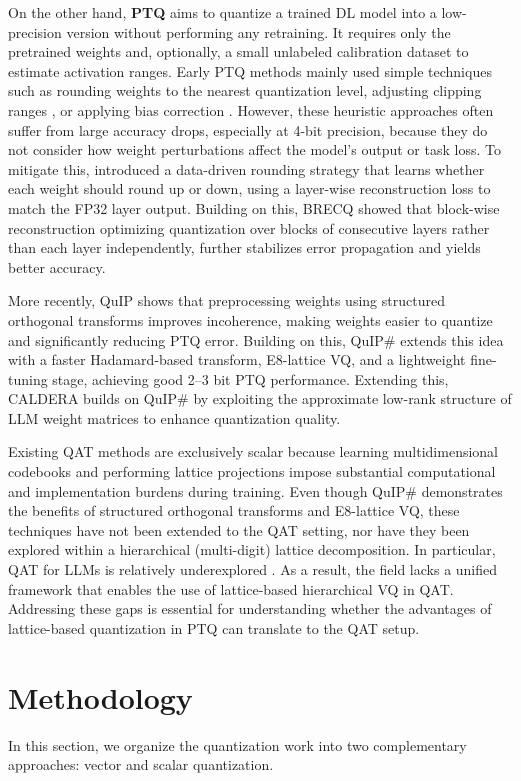 \documentclass{article}
\theoremstyle{definition}
\theoremstyle{remark}
\begin{document}
On the other hand, \textbf{PTQ} aims to quantize a trained DL model into a low-precision version without performing any retraining. It requires only the pretrained weights and, optionally, a small unlabeled calibration dataset to estimate activation ranges. Early PTQ methods mainly used simple techniques such as rounding weights to the nearest quantization level, adjusting clipping ranges \cite{banner2019post, choukroun2019low}, or applying bias correction \cite{nagel2019data}. However, these heuristic approaches often suffer from large accuracy drops, especially at 4-bit precision, because they do not consider how weight perturbations affect the model’s output or task loss. To mitigate this, \cite{nagel2020up} introduced a data-driven rounding strategy that learns whether each weight should round up or down, using a layer-wise reconstruction loss to match the FP32 layer output. Building on this,  BRECQ \cite{li2021brecq} showed that block-wise reconstruction optimizing quantization over blocks of consecutive layers rather than each layer independently, further stabilizes error propagation and yields better accuracy. 

More recently, QuIP \cite{quip} shows that preprocessing weights using structured orthogonal transforms improves incoherence, making weights easier to quantize and significantly reducing PTQ error. Building on this, QuIP\#\cite{quip2} extends this idea with a faster Hadamard-based transform, E8-lattice VQ, and a lightweight fine-tuning stage, achieving good 2–3 bit PTQ performance. Extending this, CALDERA \cite{saha2024compressing} builds on QuIP\# by exploiting the approximate low-rank structure of LLM weight matrices to enhance quantization quality. 

Existing QAT methods are exclusively scalar because learning multidimensional codebooks and performing lattice projections impose substantial computational and implementation burdens during training. Even though QuIP\# demonstrates the benefits of structured orthogonal transforms and E8-lattice VQ, these techniques have not been extended to the QAT setting, nor have they been explored within a hierarchical (multi-digit) lattice decomposition. In particular, QAT for LLMs is relatively underexplored \cite{quip}. As a result, the field lacks a unified framework that enables the use of lattice-based hierarchical VQ in QAT. Addressing these gaps is essential for understanding whether the advantages of lattice-based quantization in PTQ can translate to the QAT setup.

\section{Methodology}
In this section, we organize the quantization work into two complementary approaches: vector and scalar quantization.
\end{document}
